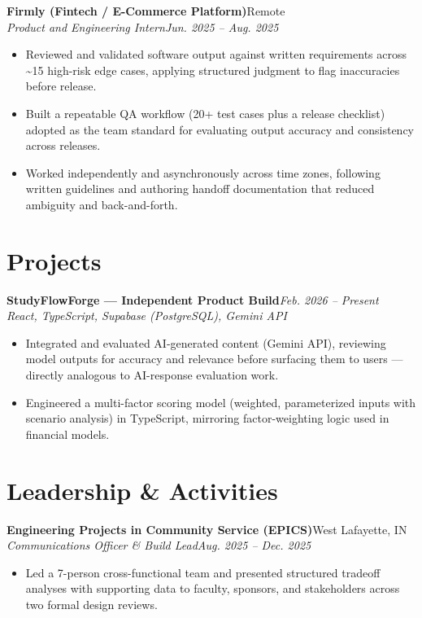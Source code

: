 \documentclass[10pt,letterpaper]{article}
\newcommand{\entry}[4]{%
  \textbf{#1}\hfill #2\\[1pt]
  \textit{#3}\hfill \textit{#4}\\[2pt]
}
\begin{document}
\entry{Firmly (Fintech / E-Commerce Platform)}{Remote}{Product and Engineering Intern}{Jun. 2025 -- Aug. 2025}
\begin{itemize}
  \item Reviewed and validated software output against written requirements across \textasciitilde15 high-risk edge cases, applying structured judgment to flag inaccuracies before release.
  \item Built a repeatable QA workflow (20+ test cases plus a release checklist) adopted as the team standard for evaluating output accuracy and consistency across releases.
  \item Worked independently and asynchronously across time zones, following written guidelines and authoring handoff documentation that reduced ambiguity and back-and-forth.
\end{itemize}

\section*{Projects}
\textbf{StudyFlowForge --- Independent Product Build}\hfill \textit{Feb. 2026 -- Present}\\[1pt]
\textit{React, TypeScript, Supabase (PostgreSQL), Gemini API}
\begin{itemize}
  \item Integrated and evaluated AI-generated content (Gemini API), reviewing model outputs for accuracy and relevance before surfacing them to users --- directly analogous to AI-response evaluation work.
  \item Engineered a multi-factor scoring model (weighted, parameterized inputs with scenario analysis) in TypeScript, mirroring factor-weighting logic used in financial models.
\end{itemize}

\section*{Leadership \& Activities}
\textbf{Engineering Projects in Community Service (EPICS)}\hfill West Lafayette, IN\\[1pt]
\textit{Communications Officer \& Build Lead}\hfill \textit{Aug. 2025 -- Dec. 2025}
\begin{itemize}
  \item Led a 7-person cross-functional team and presented structured tradeoff analyses with supporting data to faculty, sponsors, and stakeholders across two formal design reviews.
\end{itemize}
\end{document}
